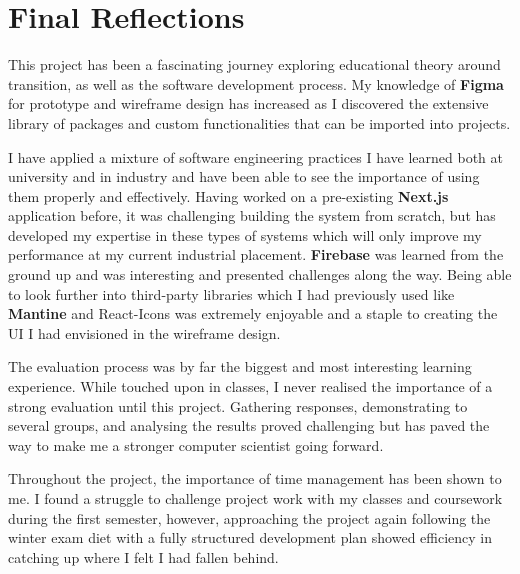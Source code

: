 \documentclass{l4proj}
\begin{document}
\section{Final Reflections}
This project has been a fascinating journey exploring educational theory around transition,  as well as the software development process. My knowledge of \textbf{Figma} for prototype and wireframe design has increased as I discovered the extensive library of packages and custom functionalities that can be imported into projects.

I have applied a mixture of software engineering practices I have learned both at university and in industry and have been able to see the importance of using them properly and effectively. Having worked on a pre-existing \textbf{Next.js} application before,  it was challenging building the system from scratch,  but has developed my expertise in these types of systems which will only improve my performance at my current industrial placement. \textbf{Firebase} was learned from the ground up and was interesting and presented challenges along the way. Being able to look further into third-party libraries which I had previously used like \textbf{Mantine} and React-Icons was extremely enjoyable and a staple to creating the UI I had envisioned in the wireframe design.

The evaluation process was by far the biggest and most interesting learning experience. While touched upon in classes,  I never realised the importance of a strong evaluation until this project. Gathering responses,  demonstrating to several groups,  and analysing the results proved challenging but has paved the way to make me a stronger computer scientist going forward. 

Throughout the project,  the importance of time management has been shown to me. I found a struggle to challenge project work with my classes and coursework during the first semester,  however,  approaching the project again following the winter exam diet with a fully structured development plan showed efficiency in catching up where I felt I had fallen behind.

%
% 
\end{document}

